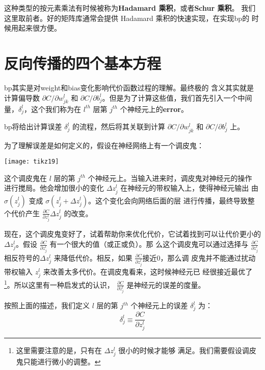 这种类型的按元素乘法有时候被称为\textbf{Hadamard 乘积}，或者\textbf{Schur 乘积}。
我们这里取前者。好的矩阵库通常会提供 Hadamard 乘积的快速实现，在实现\gls*{bp}的
时候用起来很方便。

\section{反向传播的四个基本方程}
\label{sec:the_four_fundamental_equations_behind_backpropagation}

\gls*{bp}其实是对\gls*{weight}和\gls*{bias}变化影响代价函数过程的理解。最终极的
含义其实就是计算偏导数 $\partial C/\partial w_{jk}^l$ 和 $\partial C/\partial
b_j^l$。但是为了计算这些值，我们首先引入一个中间量，$\delta_j^l$，这个我们称为在
$l^{th}$ 层第 $j^{th}$ 个神经元上的\textbf{\gls{error}}。

\gls*{bp}将给出计算误差 $\delta_j^l$ 的流程，然后将其关联到计算 $\partial
C/\partial w_{jk}^l$ 和 $\partial C/\partial b_j^l$ 上。

为了理解误差是如何定义的，假设在神经网络上有一个调皮鬼：

\begin{center}
  \texttt{[image: tikz19]}
\end{center}

这个调皮鬼在 $l$ 层的第 $j^{th}$ 个神经元上。当输入进来时，调皮鬼对神经元的操作
进行搅局。他会增加很小的变化 $\Delta z_j^l$ 在神经元的带权输入上，使得神经元输出
由 $\sigma(z_j^l)$ 变成 $\sigma(z_j^l + \Delta z_j^l)$。这个变化会向网络后面的层
进行传播，最终导致整个代价产生 $\frac{\partial C}{\partial z_j^l} \Delta z_j^l$
的改变。

现在，这个调皮鬼变好了，试着帮助你来优化代价，它试着找到可以让代价更小的$\Delta
z_j^l$。假设 $\frac{\partial C}{\partial z_j^l}$ 有一个很大的值（或正或负）。那
么这个调皮鬼可以通过选择与 $\frac{\partial C}{\partial z_j^l}$ 相反符号的$\Delta
z_j^l$ 来降低代价。相反，如果 $\frac{\partial C}{\partial z_j^l}$接近$0$，那么调
皮鬼并不能通过扰动带权输入 $z_j^l$ 来改善太多代价。在调皮鬼看来，这时候神经元已
经很接近最优了\footnote{这里需要注意的是，只有在 $\Delta z_j^l$ 很小的时候才能够
  满足。我们需要假设调皮鬼只能进行微小的调整。}。所以这里有一种启发式的认识，
$\frac{\partial C}{\partial z_j^l}$ 是神经元的误差的度量。

按照上面的描述，我们定义 $l$ 层的第 $j^{th}$ 个神经元上的误差 $\delta_j^l$ 为：
\begin{equation}
  \delta^l_j \equiv \frac{\partial C}{\partial z^l_j}
  \label{eq:29}\tag{29}
\end{equation}

